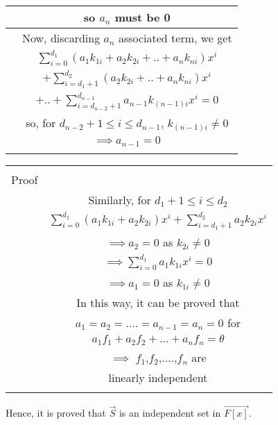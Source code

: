 \documentclass[journal,12pt,twocolumn]{IEEEtran}
\renewcommand\thesection{\arabic{section}}
\begin{document}
\begin{table}[h!]
\begin{center}
\begin{tabular}{|c|c|}
& so $a_n$ must be 0\\
\hline
& Now, discarding $a_n$ associated term, we get\\
& $\sum_{i=0}^{d_1}(a_1k_{1i}+a_2k_{2i}+..+a_nk_{ni})x^i$\\
& $+\sum_{i=d_1+1}^{d_2}(a_2k_{2i}+..+a_nk_{ni})x^i$\\
& $+..+\sum_{i=d_{n-2}+1}^{d_{n-1}}a_{n-1}k_{(n-1)i}x^i =0$\\
& so, for $d_{n-2}+1\leq i \leq d_{n-1}$, $k_{(n-1)i}\neq 0$\\
& $\implies a_{n-1}=0$ \\
& \\
\hline
\end{tabular}
\end{center}
\end{table}

\begin{table}[h!]
\begin{center}
\begin{tabular}{|c|c|}
\hline
& \\
Proof & \\
& Similarly, for $d_1+1 \leq i \leq d_2$\\
& $\sum_{i=0}^{d_1}(a_1k_{1i}+a_2k_{2i})x^i + \sum_{i=d_1+1}^{d_2}a_2k_{2i}x^i$\\
& $\implies a_2=0$ as $k_{2i} \neq 0$\\
& $\implies \sum_{i=0}^{d_1}a_1k_{1i}x^i=0$\\
& $\implies a_1=0$ as $k_{1i} \neq 0$\\
\hline
& In this way, it can be proved that\\
& $a_1=a_2=....=a_{n-1}=a_n=0$ for\\
& $a_1f_1+a_2f_2+...+a_nf_n=\theta$\\
& $\implies$ $f_1$,$f_2$,....,$f_n$ are\\
& linearly independent\\
& \\
\hline
\end{tabular}
\end{center}
\end{table}


Hence, it is proved that $\vec{S}$ is an independent set in $\vec{F[x]}$.
\end{document}
